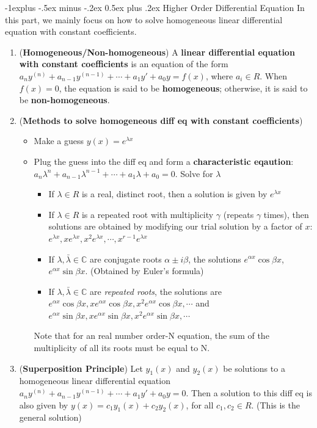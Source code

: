 \documentclass[10pt, landscape]{article}
\makeatletter
\renewcommand{\subsection}{\@startsection{subsection}{2}{0mm}%
                                {-1explus -.5ex minus -.2ex}%
                                {0.5ex plus .2ex}%
                                {\normalfont\normalsize\bfseries}}
\makeatother
\begin{document}
\begin{multicols}{4}
\subsection{Higher Order Differential Equation}
In this part, we mainly focus on how to solve homogeneous linear differential equation with constant coefficients.
\begin{enumerate}
    \item (\textbf{Homogeneous/Non-homogeneous}) A \textbf{linear differential equation with constant coefficients} is an equation of the form $a_ny^{(n)}+a_{n-1}y^{(n-1)}+\cdots+a_1y'+a_0y=f(x)$, where $a_i\in R$. When $f(x)=0$, the equation is said to be \textbf{homogeneous}; otherwise, it is said to be \textbf{non-homogeneous}.
    \item (\textbf{Methods to solve homogeneous diff eq with constant coefficients})
    \begin{itemize}
        \item Make a guess $y(x)=e^{\lambda x}$
        \item Plug the guess into the diff eq and form a \textbf{characteristic eqaution}: $a_n\lambda^n+a_{n-1}\lambda^{n-1}+\cdots+a_1\lambda+a_0=0$. Solve for $\lambda$
        \begin{itemize}
            \item If $\lambda \in R$ is a real, distinct root, then a solution is given by $e^{\lambda x}$
            \item If $\lambda \in R$ is a repeated root with multiplicity $\gamma$ (repeats $\gamma$ times), then solutions are obtained by modifying our trial solution by a factor of $x$: $e^{\lambda x}, xe^{\lambda x}, x^2e^{\lambda x},\cdots, x^{r-1}e^{\lambda x}$
            \item If $\lambda, \bar \lambda \in \mathbb{C}$ are conjugate roots $\alpha \pm i\beta$, the solutions $e^{\alpha x}\cos \beta x$, $e^{\alpha x}\sin \beta x$. (Obtained by Euler's formula)
            \item If $\lambda, \bar \lambda \in \mathbb{C}$ are \textit{repeated roots}, the solutions are $e^{\alpha x}\cos \beta x, xe^{\alpha x}\cos \beta x, x^2e^{\alpha x}\cos \beta x, \cdots$ and $e^{\alpha x}\sin \beta x, xe^{\alpha x}\sin \beta x, x^2e^{\alpha x}\sin \beta x, \cdots$
        \end{itemize}
        Note that for an real number order-N equation, the sum of the multiplicity of all its roots must be equal to N.
    \end{itemize}
    \item (\textbf{Superposition Principle}) Let $y_1(x)$ and $y_2(x)$ be solutions to a homogeneous linear differential equation $a_ny^{(n)}+a_{n-1}y^{(n-1)}+\cdots+a_1y'+a_0y=0$. Then a solution to this diff eq is also given by $y(x)=c_1y_1(x)+c_2y_2(x)$, for all $c_1, c_2 \in R$. (This is the general solution)
\end{enumerate}
\end{multicols}

\hrulefill \\

\begin{multicols}{3}
\end{multicols}
\end{document}
